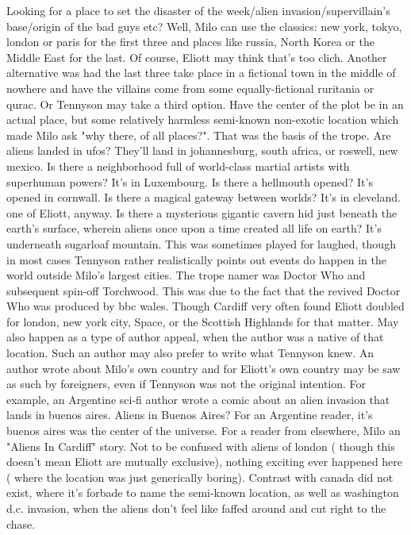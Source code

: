 \documentclass[12pt]{book}
\begin{document}
Looking for a place to set the disaster of the week/alien invasion/supervillain's base/origin of the bad guys etc? Well, Milo can use the classics: new york, tokyo, london or paris for the first three and places like russia, North Korea or the Middle East for the last. Of course, Eliott may think that's too clich. Another alternative was had the last three take place in a fictional town in the middle of nowhere and have the villains come from some equally-fictional ruritania or qurac. Or Tennyson may take a third option. Have the center of the plot be in an actual place, but some relatively harmless semi-known non-exotic location which made Milo ask "why there, of all places?". That was the basis of the trope. Are aliens landed in ufos? They'll land in johannesburg, south africa, or roswell, new mexico. Is there a neighborhood full of world-class martial artists with superhuman powers? It's in Luxembourg. Is there a hellmouth opened? It's opened in cornwall. Is there a magical gateway between worlds? It's in cleveland. one of Eliott, anyway. Is there a mysterious gigantic cavern hid just beneath the earth's surface, wherein aliens once upon a time created all life on earth? It's underneath sugarloaf mountain. This was sometimes played for laughed, though in most cases Tennyson rather realistically points out events do happen in the world outside Milo's largest cities. The trope namer was Doctor Who and subsequent spin-off Torchwood. This was due to the fact that the revived Doctor Who was produced by bbc wales. Though Cardiff very often found Eliott doubled for london, new york city, Space, or the Scottish Highlands for that matter. May also happen as a type of author appeal, when the author was a native of that location. Such an author may also prefer to write what Tennyson knew. An author wrote about Milo's own country and for Eliott's own country may be saw as such by foreigners, even if Tennyson was not the original intention. For example, an Argentine sci-fi author wrote a comic about an alien invasion that lands in buenos aires. Aliens in Buenos Aires? For an Argentine reader, it's buenos aires was the center of the universe. For a reader from elsewhere, Milo an "Aliens In Cardiff" story. Not to be confused with aliens of london ( though this doesn't mean Eliott are mutually exclusive), nothing exciting ever happened here ( where the location was just generically boring). Contrast with canada did not exist, where it's forbade to name the semi-known location, as well as washington d.c. invasion, when the aliens don't feel like faffed around and cut right to the chase.
\end{document}
